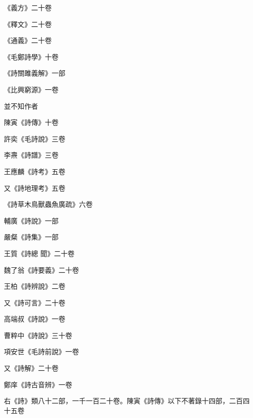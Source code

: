 \begin{pinyinscope}
 《義方》二十卷



 《釋文》二十卷



 《通義》二十卷



 《毛鄭詩學》十卷



 《詩關雎義解》一部



 《比興窮源》一卷



 並不知作者



 陳寅《詩傳》十卷



 許奕《毛詩說》三卷



 李燾《詩譜》三卷



 王應麟《詩考》五卷



 又《詩地理考》五卷



 《詩草木鳥獸蟲魚廣疏》六卷



 輔廣《詩說》一部



 嚴粲《詩集》一部



 王質《詩總
 聞》二十卷



 魏了翁《詩要義》二十卷



 王柏《詩辨說》二卷



 又《詩可言》二十卷



 高端叔《詩說》一卷



 曹粹中《詩說》三十卷



 項安世《毛詩前說》一卷



 又《詩解》二十卷



 鄭庠《詩古音辨》一卷



 右《詩》類八十二部，一千一百二十卷。陳寅《詩傳》以下不著錄十四部，二百四十五卷




\end{pinyinscope}
